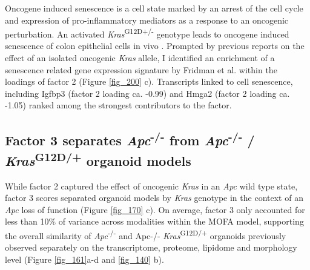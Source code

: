 \begin{flushleft}
\bigbreak
Oncogene induced senescence is a cell state marked by an arrest of the cell cycle and expression of pro-inflammatory mediators as a response to an oncogenic perturbation. An activated \textit{Kras}\textsuperscript{G12D+/-} genotype leads to oncogene induced senescence of colon epithelial cells in vivo \parencite{benneckeInk4aArfOncogeneinduced2010}. Prompted by previous reports on the effect of an isolated oncogenic \textit{Kras} allele, I identified an enrichment of a senescence related gene expression signature by Fridman et al. within the loadings of factor 2 \parencite{fridmanCriticalPathwaysCellular2008} (Figure \ref{fig_200} c). Transcripts linked to cell senescence, including Igfbp3 (factor 2 loading ca. -0.99) and Hmga2 (factor 2 loading ca. -1.05) ranked among the strongest contributors to the factor. 
\bigbreak


\clearpage
\subsection{Factor 3 separates \textit{Apc}\textsuperscript{-/-} from \textit{Apc}\textsuperscript{-/-} / \textit{Kras}\textsuperscript{G12D/+} organoid models}

While factor 2 captured the effect of oncogenic \textit{Kras} in an \textit{Apc} wild type state, factor 3 scores separated organoid models by \textit{Kras} genotype in the context of an \textit{Apc} loss of function (Figure \ref{fig_170} c). On average, factor 3 only accounted for less than 10\% of variance across modalities within the MOFA model, supporting the overall similarity of \textit{Apc}\textsuperscript{-/-}  and Apc-/- \textit{Kras}\textsuperscript{G12D/+} organoids previously observed separately on the transcriptome, proteome, lipidome and morphology level (Figure \ref{fig_161}a-d and \ref{fig_140} b).


\end{flushleft}
